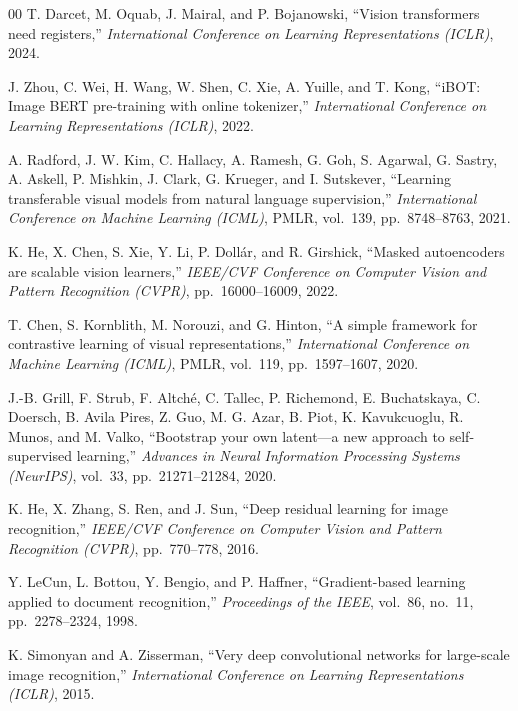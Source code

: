 \documentclass[journal]{IEEEtran}
\begin{document}
\begin{thebibliography}{00}
T. Darcet, M. Oquab, J. Mairal, and P. Bojanowski,
``Vision transformers need registers,''
\textit{International Conference on Learning Representations (ICLR)}, 2024.

J. Zhou, C. Wei, H. Wang, W. Shen, C. Xie, A. Yuille, and T. Kong,
``iBOT: Image BERT pre-training with online tokenizer,''
\textit{International Conference on Learning Representations (ICLR)}, 2022.

A. Radford, J. W. Kim, C. Hallacy, A. Ramesh, G. Goh, S. Agarwal, G. Sastry,
A. Askell, P. Mishkin, J. Clark, G. Krueger, and I. Sutskever,
``Learning transferable visual models from natural language supervision,''
\textit{International Conference on Machine Learning (ICML)},
PMLR, vol.~139, pp.~8748--8763, 2021.

K. He, X. Chen, S. Xie, Y. Li, P. Dollár, and R. Girshick,
``Masked autoencoders are scalable vision learners,''
\textit{IEEE/CVF Conference on Computer Vision and Pattern Recognition (CVPR)},
pp.~16000--16009, 2022.

T. Chen, S. Kornblith, M. Norouzi, and G. Hinton,
``A simple framework for contrastive learning of visual representations,''
\textit{International Conference on Machine Learning (ICML)},
PMLR, vol.~119, pp.~1597--1607, 2020.

J.-B. Grill, F. Strub, F. Altché, C. Tallec, P. Richemond, E. Buchatskaya,
C. Doersch, B. Avila Pires, Z. Guo, M. G. Azar, B. Piot, K. Kavukcuoglu,
R. Munos, and M. Valko,
``Bootstrap your own latent---a new approach to self-supervised learning,''
\textit{Advances in Neural Information Processing Systems (NeurIPS)},
vol.~33, pp.~21271--21284, 2020.

K. He, X. Zhang, S. Ren, and J. Sun,
``Deep residual learning for image recognition,''
\textit{IEEE/CVF Conference on Computer Vision and Pattern Recognition (CVPR)},
pp.~770--778, 2016.

Y. LeCun, L. Bottou, Y. Bengio, and P. Haffner,
``Gradient-based learning applied to document recognition,''
\textit{Proceedings of the IEEE}, vol.~86, no.~11, pp.~2278--2324, 1998.

K. Simonyan and A. Zisserman,
``Very deep convolutional networks for large-scale image recognition,''
\textit{International Conference on Learning Representations (ICLR)}, 2015.


\end{thebibliography}
\end{document}
